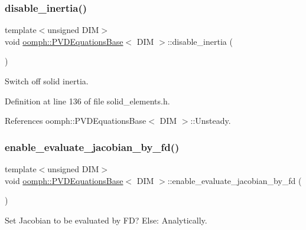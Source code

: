 \subsubsection{\texorpdfstring{disable\+\_\+inertia()}{disable\_inertia()}}
{\footnotesize\ttfamily template$<$unsigned D\+IM$>$ \\
void \hyperlink{classoomph_1_1PVDEquationsBase}{oomph\+::\+P\+V\+D\+Equations\+Base}$<$ D\+IM $>$\+::disable\+\_\+inertia (\begin{DoxyParamCaption}{ }\end{DoxyParamCaption})\hspace{0.3cm}{\ttfamily [inline]}}



Switch off solid inertia. 



Definition at line 136 of file solid\+\_\+elements.\+h.



References oomph\+::\+P\+V\+D\+Equations\+Base$<$ D\+I\+M $>$\+::\+Unsteady.

\mbox{\label{classoomph_1_1PVDEquationsBase_ae3a43aed7cc42dac606e14ab90bb1c08}} 
\subsubsection{\texorpdfstring{enable\+\_\+evaluate\+\_\+jacobian\+\_\+by\+\_\+fd()}{enable\_evaluate\_jacobian\_by\_fd()}}
{\footnotesize\ttfamily template$<$unsigned D\+IM$>$ \\
void \hyperlink{classoomph_1_1PVDEquationsBase}{oomph\+::\+P\+V\+D\+Equations\+Base}$<$ D\+IM $>$\+::enable\+\_\+evaluate\+\_\+jacobian\+\_\+by\+\_\+fd (\begin{DoxyParamCaption}{ }\end{DoxyParamCaption})\hspace{0.3cm}{\ttfamily [inline]}}



Set Jacobian to be evaluated by FD? Else\+: Analytically. 



